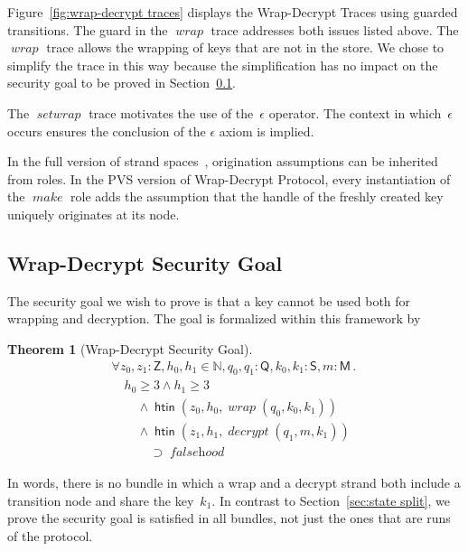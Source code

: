 \documentclass[12pt]{article}
\newtheorem{thm}{Theorem}
\newcommand{\cn}[1]{\ensuremath{\operatorname{\mathsf{#1}}}}
\newcommand{\fn}[1]{\ensuremath{\operatorname{\mathit{#1}}}}
\newcommand{\srt}[1]{\ensuremath{\mathsf{#1}}}
\newcommand{\typ}{\mathbin:}
\newcommand{\nat}{\ensuremath{\mathbb{N}}}
\newcommand{\all}[1]{\forall#1\mathpunct.}
\begin{document}
Figure~\ref{fig:wrap-decrypt traces} displays the Wrap-Decrypt Traces
using guarded transitions.  The guard in the \fn{wrap} trace addresses
both issues listed above.  The \fn{wrap} trace allows the wrapping of
keys that are not in the store.  We chose to simplify the trace in
this way because the simplification has no impact on the security goal
to be proved in Section~\ref{sec:security goal}.

The \fn{setwrap} trace motivates the use of the~$\epsilon$ operator.
The context in which~$\epsilon$ occurs ensures the conclusion of the
$\epsilon$ axiom is implied.

In the full version of strand spaces~\cite{Ramsdell13}, origination
assumptions can be inherited from roles.  In the PVS version of
Wrap-Decrypt Protocol, every instantiation of the \fn{make} role adds
the assumption that the handle of the freshly created key
uniquely originates at its node.

\subsection{Wrap-Decrypt Security Goal}\label{sec:security goal}

The security goal we wish to prove is that a key cannot be used both
for wrapping and decryption.  The goal is formalized within this
framework by


\begin{thm}[Wrap-Decrypt Security Goal]\label{thm:security goal}
\[
\begin{array}{l}
  \all{z_0,z_1\typ\srt{Z},h_0,h_1\in\nat,q_0,q_1\typ\srt{Q},
    k_0,k_1\typ\srt{S},m\typ\srt{M}}\\
  \quad h_0\geq 3\land h_1\geq 3\\
  \qquad{}\land\cn{htin}(z_0,h_0,\fn{wrap}(q_0,k_0,k_1))\\
  \qquad{}\land\cn{htin}(z_1,h_1,\fn{decrypt}(q_1,m,k_1))\\
  \qquad\quad{}\supset\fn{falsehood}
\end{array}
\]
\end{thm}

In words, there is no bundle in which a wrap and a decrypt strand both
include a transition node and share the key~$k_1$.  In contrast to
Section~\ref{sec:state split}, we prove the security goal is
satisfied in all bundles, not just the ones that are runs of the
protocol.
\end{document}

